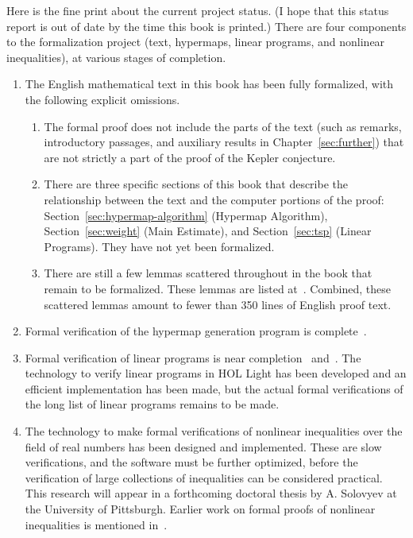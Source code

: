 Here is the fine print about the current project status. (I hope that
this status report is out of date by the time this book is printed.)
There are four components to the formalization project (text, hypermaps, linear programs,
and nonlinear inequalities), at various stages of completion.
\begin{enumerate}
\item
The English mathematical text in this book has been fully
  formalized, with the following explicit omissions.
\begin{enumerate}
\item The formal proof does not include the parts of the text (such
  as remarks, introductory passages, and auxiliary results in 
  Chapter~\ref{sec:further}) that are
  not strictly a part of the proof of the Kepler conjecture.
\item There are three specific sections of this book that describe
  the relationship between the text and the computer portions of
  the proof: Section~\ref{sec:hypermap-algorithm} (Hypermap Algorithm), 
  Section~\ref{sec:weight} (Main Estimate), and Section~\ref{sec:tsp} (Linear Programs).
  They have not yet been formalized.
\item There are still a few lemmas scattered throughout in the book that remain to be formalized.
These lemmas are listed at~\cite{website:FlyspeckProject}.
Combined, these scattered lemmas amount to fewer than 350 lines of English proof text.
\end{enumerate}
\item Formal verification of the hypermap generation program is complete~\cite{Nipkow:2005:Tame}.
\item Formal verification of linear programs is near 
completion~\cite{Obua:2005:Thesis} and~\cite{Solovyev:LP}.
 The technology to verify linear programs in HOL Light has been developed and 
  an efficient implementation has been made, but the actual formal verifications of the
  long list of linear programs remains to be made.
\item The technology to make formal verifications of nonlinear inequalities over the
field of real numbers has been designed and implemented.   These are slow verifications,
and the software must be further optimized, before the verification of large collections
of inequalities can be considered practical.  This research will appear in a forthcoming doctoral 
thesis by A. Solovyev
at the University of Pittsburgh.  Earlier work on formal proofs of nonlinear inequalities
is mentioned in~\cite{HHMNOZ}.
\end{enumerate}


